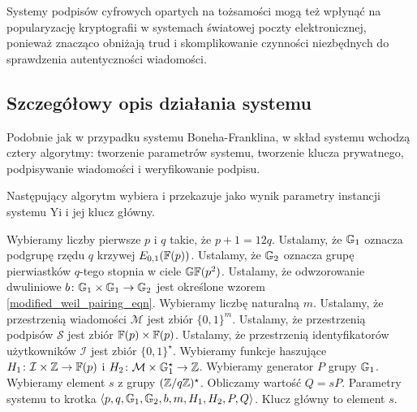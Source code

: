 \noindent
Systemy podpisów cyfrowych opartych na tożsamości
mogą też wpłynąć na popularyzację kryptografii
w systemach światowej poczty elektronicznej,
ponieważ znacząco obniżają trud i skomplikowanie
czynności niezbędnych do sprawdzenia autentyczności wiadomości.

\subsection*{Szczegółowy opis działania systemu}

\noindent
Podobnie jak w przypadku systemu Boneha-Franklina,
w skład systemu wchodzą cztery algorytmy:
tworzenie parametrów systemu, tworzenie klucza prywatnego,
podpisywanie wiadomości i weryfikowanie podpisu.

\begin{algorithm}
Następujący algorytm wybiera i przekazuje jako wynik
parametry instancji systemu Yi
i jej klucz główny.

\begin{codebox}
\li
Wybieramy liczby pierwsze $p$ i $q$ takie,
że $p+1 = 12q$.
\li
Ustalamy, że $\mathbb{G}_1$ oznacza podgrupę rzędu $q$ krzywej $E_{0,1}(\mathbb{F}(p))$.
\li
Ustalamy, że $\mathbb{G}_2$ oznacza grupę pierwiastków $q$-tego stopnia w ciele $\mathbb{GF}(p^2)$.
\li
Ustalamy, że odwzorowanie dwuliniowe $b\colon \mathbb{G}_1 \times \mathbb{G}_1 \to \mathbb{G}_2$
jest określone wzorem \ref{modified_weil_pairing_eqn}.
\li
Wybieramy liczbę naturalną $m$.
\li
Ustalamy, że przestrzenią wiadomości $\mathcal{M}$
jest zbiór $\{0, 1\}^m$.
\li
Ustalamy, że przestrzenią podpisów $\mathcal{S}$
jest zbiór $\mathbb{F}(p) \times \mathbb{F}(p)$.
\li
Ustalamy, że przestrzenią identyfikatorów użytkowników $\mathcal{I}$
jest zbiór $\{0, 1\}^\star$.
\li
Wybieramy funkcje haszujące
$H_1\colon \mathcal{I} \times \mathbb{Z} \to \mathbb{F}(p)$
i $H_2\colon \mathcal{M} \times \mathbb{G}_1^\star \to \mathbb{Z}$.
\li
Wybieramy generator $P$ grupy $\mathbb{G}_1$.
\li
Wybieramy element $s$ z grupy $(\mathbb{Z}/q\mathbb{Z})^\star$.
\li
Obliczamy wartość $Q = sP$.
\li
Parametry systemu to krotka
$\left\langle p, q, \mathbb{G}_1, \mathbb{G}_2, b, m, H_1, H_2, P, Q \right\rangle$.
\li
Klucz główny to element $s$.
\end{codebox}
\end{algorithm}


